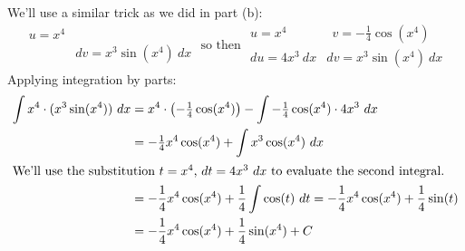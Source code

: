 \begin{enumerate}[leftmargin=0pt]
\begin{enumerate}
    \begin{red}
    We'll use a similar trick as we did in part (b):
    \[\begin{array}{ll}
        u = x^4 &  \\
         & dv = x^3\sin(x^4)\ dx
    \end{array}
    \textrm{ so then }
    \begin{array}{ll}
        u = x^4 & \ \ v = -\tfrac14 \cos(x^4) \\
        du = 4x^3\ dx &  dv = x^3\sin(x^4)\ dx
    \end{array}
    \]
    Applying integration by parts:
    \begin{align*}
        \int x^4\cdot (x^3\sin(x^4))\ dx &= x^4 \cdot \left(-\tfrac14 \cos(x^4)\right) - \int -\tfrac14\cos(x^4)\cdot 4x^3\ dx \\
        &= -\tfrac14 x^4\cos(x^4) + \int x^3\cos(x^4)\ dx\\
        \intertext{We'll use the substitution $t = x^4$, $dt = 4x^3\ dx$ to evaluate the second integral.}
        &= -\frac14 x^4\cos(x^4) + \frac14 \int \cos(t)\ dt
         = -\frac14 x^4\cos(x^4) + \frac14 \sin(t) \\
        & = -\frac14 x^4\cos(x^4) + \frac14 \sin(x^4) + C
    \end{align*}
    \end{red}
\end{enumerate}
\end{enumerate}
